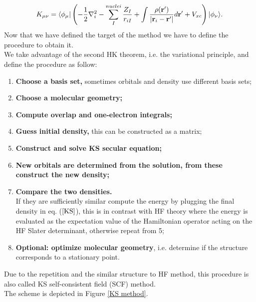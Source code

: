 \begin{equation}
    K_{\mu \nu} = \langle\phi_{\mu}| \left( -\frac12\nabla^2_i -\sum_I^{nuclei}\frac{Z_I}{r_{iI}} + \int \frac{\rho({\bf r}')}{|{\bf r}_i - {\bf r}'|} d{\bf r}' + V_{xc} \right) |\phi_{\nu}\rangle. \label{K mu nu}
\end{equation}
Now that we have defined the target of the method we have to define the procedure to obtain it. \\
We take advantage of the second HK theorem, i.e. the variational principle, and define the procedure as follow:
\begin{enumerate}
    \item \textbf{Choose a basis set,} sometimes orbitals and density use different basis sets;
    \item \textbf{Choose a molecular geometry;}
    \item \textbf{Compute overlap and one-electron integrals;}
    \item \textbf{Guess initial density,} this can be constructed as a matrix;
    \item \textbf{Construct and solve KS secular equation;}
    \item \textbf{New orbitals are determined from the solution, from these construct the new density;}
    \item \textbf{Compare the two densities.} \\
    If they are sufficiently similar compute the energy by plugging the final density in eq. ($\ref{KS}$), this is in contrast with HF theory where the energy is evaluated as the expectation value of the Hamiltonian operator acting on the HF Slater determinant, otherwise repeat from 5;
    \item \textbf{Optional: optimize molecular geometry}, i.e. determine if the structure corresponds to a stationary point.
\end{enumerate}
Due to the repetition and the similar structure to HF method, this procedure is also called KS self-consistent field (SCF) method. \\
The scheme is depicted in Figure \ref{KS method}. \\
